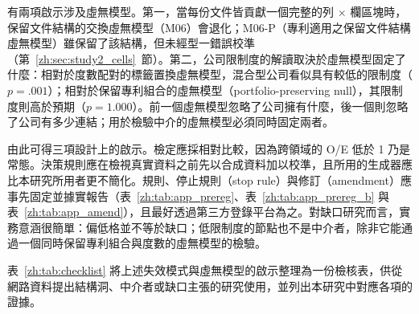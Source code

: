 有兩項啟示涉及虛無模型。第一，當每份文件皆貢獻一個完整的列 $\times$ 欄區塊時，保留文件結構的交換虛無模型（M06）會退化；M06-P（專利適用之保留文件結構虛無模型）雖保留了該結構，但未經型一錯誤校準（第~\ref{zh:sec:study2_cells}~節）。第二，公司限制度的解讀取決於虛無模型固定了什麼：相對於度數配對的標籤置換虛無模型，混合型公司看似具有較低的限制度（$p=.001$）；相對於保留專利組合的虛無模型（portfolio-preserving null），其限制度則高於預期（$p=1.000$）。前一個虛無模型忽略了公司擁有什麼，後一個則忽略了公司有多少連結；用於檢驗中介的虛無模型必須同時固定兩者。

由此可得三項設計上的啟示。檢定應採相對比較，因為跨領域的 O/E 低於 1 乃是常態。決策規則應在檢視真實資料之前先以合成資料加以校準，且所用的生成器應比本研究所用者更不簡化。規則、停止規則（stop rule）與修訂（amendment）應事先固定並據實報告（表~\ref{zh:tab:app_prereg}、表~\ref{zh:tab:app_prereg_b} 與表~\ref{zh:tab:app_amend}），且最好透過第三方登錄平台為之。對缺口研究而言，實務意涵很簡單：偏低格並不等於缺口；低限制度的節點也不是中介者，除非它能通過一個同時保留專利組合與度數的虛無模型的檢驗。

表~\ref{zh:tab:checklist} 將上述失效模式與虛無模型的啟示整理為一份檢核表，供從網路資料提出結構洞、中介者或缺口主張的研究使用，並列出本研究中對應各項的證據。

